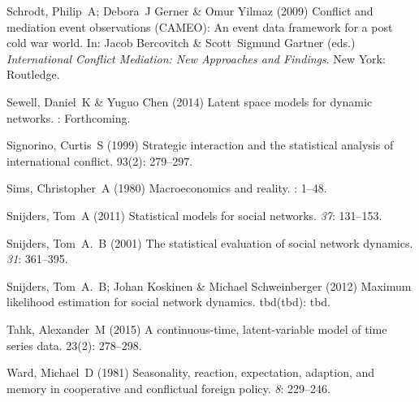 \documentclass[3p,times,twocolumn,authoryear,12pt]{elsarticle}
\begin{document}
\begin{thebibliography}{}
Schrodt, Philip~A; Debora~J Gerner  \& Omur Yilmaz (2009) Conflict and
  mediation event observations (CAMEO): An event data framework for a post cold
  war world.
\newblock In: Jacob Bercovitch \& Scott~Sigmund Gartner (eds.) {\em
  International Conflict Mediation: New Approaches and Findings}. New York:
  Routledge.

Sewell, Daniel~K  \& Yuguo Chen (2014) Latent space models for dynamic
  networks.
: Forthcoming.

Signorino, Curtis~S (1999) Strategic interaction and the statistical analysis
  of international conflict.
 { 93\/}(2): 279--297.

Sims, Christopher~A (1980) Macroeconomics and reality.
: 1--48.

Snijders, Tom~A (2011) Statistical models for social networks.
 {\em 37}: 131--153.

Snijders, Tom~A.~B (2001) The statistical evaluation of social network
  dynamics.
 {\em 31}: 361--395.

Snijders, Tom~A.~B; Johan Koskinen  \& Michael Schweinberger (2012) Maximum
  likelihood estimation for social network dynamics.
 { tbd\/}(tbd): tbd.

Tahk, Alexander~M (2015) A continuous-time, latent-variable model of time
  series data.
 { 23\/}(2): 278--298.

Ward, Michael~D (1981) Seasonality, reaction, expectation, adaption, and memory
  in cooperative and conflictual foreign policy.
 {\em 8}: 229--246.


\end{thebibliography}
\end{document}
